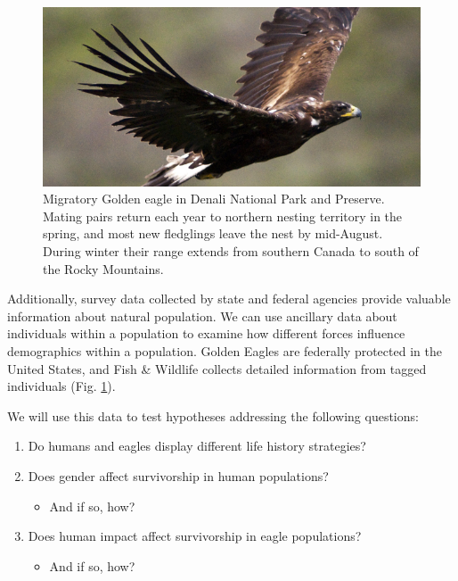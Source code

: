 \documentclass[]{book}
\providecommand{\tightlist}{%
  \setlength{\itemsep}{0pt}\setlength{\parskip}{0pt}}
\theoremstyle{definition}
\theoremstyle{definition}
\theoremstyle{definition}
\theoremstyle{remark}
\begin{document}
\begin{figure}
\centering
\includegraphics{chapter_materials/population_ecology/golden_eagle.jpg}
\caption{\label{fig:eagle-fig}Migratory Golden eagle in Denali National Park
and Preserve. Mating pairs return each year to northern nesting
territory in the spring, and most new fledglings leave the nest by
mid-August. During winter their range extends from southern Canada to
south of the Rocky Mountains\citep{brown_patterns_2017}.}
\end{figure}

Additionally, survey data collected by state and federal agencies
provide valuable information about natural population. We can use
ancillary data about individuals within a population to examine how
different forces influence demographics within a population. Golden
Eagles are federally protected in the United States, and Fish \&
Wildlife collects detailed information from tagged individuals (Fig.
\ref{fig:eagle-fig}).

We will use this data to test hypotheses addressing the following
questions:

\begin{enumerate}
\def\labelenumi{\arabic{enumi}.}
\tightlist
\item
  Do humans and eagles display different life history strategies?
\item
  Does gender affect survivorship in human populations?

  \begin{itemize}
  \tightlist
  \item
    And if so, how?
  \end{itemize}
\item
  Does human impact affect survivorship in eagle populations?

  \begin{itemize}
  \tightlist
  \item
    And if so, how?
  \end{itemize}
\end{enumerate}
\end{document}
